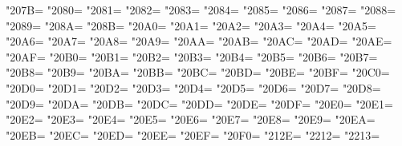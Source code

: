 \XeTeXcharclass"207B=\KclassNum
\XeTeXcharclass"2080=\KclassNum
\XeTeXcharclass"2081=\KclassNum
\XeTeXcharclass"2082=\KclassNum
\XeTeXcharclass"2083=\KclassNum
\XeTeXcharclass"2084=\KclassNum
\XeTeXcharclass"2085=\KclassNum
\XeTeXcharclass"2086=\KclassNum
\XeTeXcharclass"2087=\KclassNum
\XeTeXcharclass"2088=\KclassNum
\XeTeXcharclass"2089=\KclassNum
\XeTeXcharclass"208A=\KclassNum
\XeTeXcharclass"208B=\KclassNum
\XeTeXcharclass"20A0=\KclassNum
\XeTeXcharclass"20A1=\KclassNum
\XeTeXcharclass"20A2=\KclassNum
\XeTeXcharclass"20A3=\KclassNum
\XeTeXcharclass"20A4=\KclassNum
\XeTeXcharclass"20A5=\KclassNum
\XeTeXcharclass"20A6=\KclassNum
\XeTeXcharclass"20A7=\KclassNum
\XeTeXcharclass"20A8=\KclassNum
\XeTeXcharclass"20A9=\KclassNum
\XeTeXcharclass"20AA=\KclassNum
\XeTeXcharclass"20AB=\KclassNum
\XeTeXcharclass"20AC=\KclassNum
\XeTeXcharclass"20AD=\KclassNum
\XeTeXcharclass"20AE=\KclassNum
\XeTeXcharclass"20AF=\KclassNum
\XeTeXcharclass"20B0=\KclassNum
\XeTeXcharclass"20B1=\KclassNum
\XeTeXcharclass"20B2=\KclassNum
\XeTeXcharclass"20B3=\KclassNum
\XeTeXcharclass"20B4=\KclassNum
\XeTeXcharclass"20B5=\KclassNum
\XeTeXcharclass"20B6=\KclassNum
\XeTeXcharclass"20B7=\KclassNum
\XeTeXcharclass"20B8=\KclassNum
\XeTeXcharclass"20B9=\KclassNum
\XeTeXcharclass"20BA=\KclassNum
\XeTeXcharclass"20BB=\KclassNum
\XeTeXcharclass"20BC=\KclassNum
\XeTeXcharclass"20BD=\KclassNum
\XeTeXcharclass"20BE=\KclassNum
\XeTeXcharclass"20BF=\KclassNum
\XeTeXcharclass"20C0=\KclassNum
\XeTeXcharclass"20D0=\KclassNum
\XeTeXcharclass"20D1=\KclassNum
\XeTeXcharclass"20D2=\KclassNum
\XeTeXcharclass"20D3=\KclassNum
\XeTeXcharclass"20D4=\KclassNum
\XeTeXcharclass"20D5=\KclassNum
\XeTeXcharclass"20D6=\KclassNum
\XeTeXcharclass"20D7=\KclassNum
\XeTeXcharclass"20D8=\KclassNum
\XeTeXcharclass"20D9=\KclassNum
\XeTeXcharclass"20DA=\KclassNum
\XeTeXcharclass"20DB=\KclassNum
\XeTeXcharclass"20DC=\KclassNum
\XeTeXcharclass"20DD=\KclassNum
\XeTeXcharclass"20DE=\KclassNum
\XeTeXcharclass"20DF=\KclassNum
\XeTeXcharclass"20E0=\KclassNum
\XeTeXcharclass"20E1=\KclassNum
\XeTeXcharclass"20E2=\KclassNum
\XeTeXcharclass"20E3=\KclassNum
\XeTeXcharclass"20E4=\KclassNum
\XeTeXcharclass"20E5=\KclassNum
\XeTeXcharclass"20E6=\KclassNum
\XeTeXcharclass"20E7=\KclassNum
\XeTeXcharclass"20E8=\KclassNum
\XeTeXcharclass"20E9=\KclassNum
\XeTeXcharclass"20EA=\KclassNum
\XeTeXcharclass"20EB=\KclassNum
\XeTeXcharclass"20EC=\KclassNum
\XeTeXcharclass"20ED=\KclassNum
\XeTeXcharclass"20EE=\KclassNum
\XeTeXcharclass"20EF=\KclassNum
\XeTeXcharclass"20F0=\KclassNum
\XeTeXcharclass"212E=\KclassNum
\XeTeXcharclass"2212=\KclassNum
\XeTeXcharclass"2213=\KclassNum
